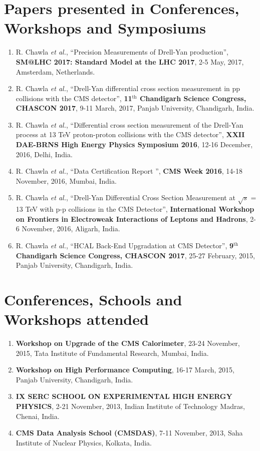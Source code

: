 \section*{Papers presented in Conferences, Workshops and Symposiums}
\begin{enumerate}
\item R. Chawla {\it et al.}, ``Precision Measurements of Drell-Yan production'', {\bf SM@LHC 2017: Standard Model at the LHC 2017}, 2-5 May, 2017, Amsterdam, Netherlands.
\item R. Chawla {\it et al.}, ``Drell-Yan differential cross section measurement in pp collisions with the CMS detector'', {\bf 11$^{\textrm{th}}$ Chandigarh Science Congress, CHASCON 2017}, 9-11 March, 2017, Panjab University, Chandigarh, India.
\item R. Chawla {\it et al.}, ``Differential cross section measurement of the Drell-Yan process at 13 TeV proton-proton collisions with the CMS detector'', {\bf XXII DAE­-BRNS High Energy Physics Symposium 2016}, 12-16 December, 2016, Delhi, India.
\item R. Chawla {\it et al.}, ``Data Certification Report
'', {\bf CMS Week 2016}, 14-18 November, 2016, Mumbai, India.
\item R. Chawla {\it et al.}, ``Drell-Yan Differential Cross Section Measurement at $\sqrt{s}$ = 13 TeV with p-p collisions in the CMS Detector'', {\bf International Workshop on Frontiers in Electroweak Interactions of Leptons and Hadrons}, 2-6 November, 2016, Aligarh, India.
\item R. Chawla {\it et al.}, ``HCAL Back-End Upgradation at CMS Detector'', {\bf 9$^{\textrm{th}}$ Chandigarh Science Congress, CHASCON 2017}, 25-27 February, 2015, Panjab University, Chandigarh, India.
\end{enumerate}

\section*{Conferences, Schools and Workshops attended}
\begin{enumerate}
\item {\bf Workshop on Upgrade of the CMS Calorimeter}, 23-24 November, 2015, Tata Institute of Fundamental Research, Mumbai, India.
\item {\bf Workshop on High Performance Computing}, 16-17 March, 2015, Panjab University, Chandigarh, India.
\item {\bf IX SERC SCHOOL ON EXPERIMENTAL HIGH ENERGY PHYSICS}, 2-21 November, 2013, Indian Institute of Technology Madras, Chenai, India.
\item {\bf CMS Data Analysis School (CMSDAS)}, 7-11 November, 2013, Saha Institute of Nuclear Physics, Kolkata, India.
\end{enumerate}

